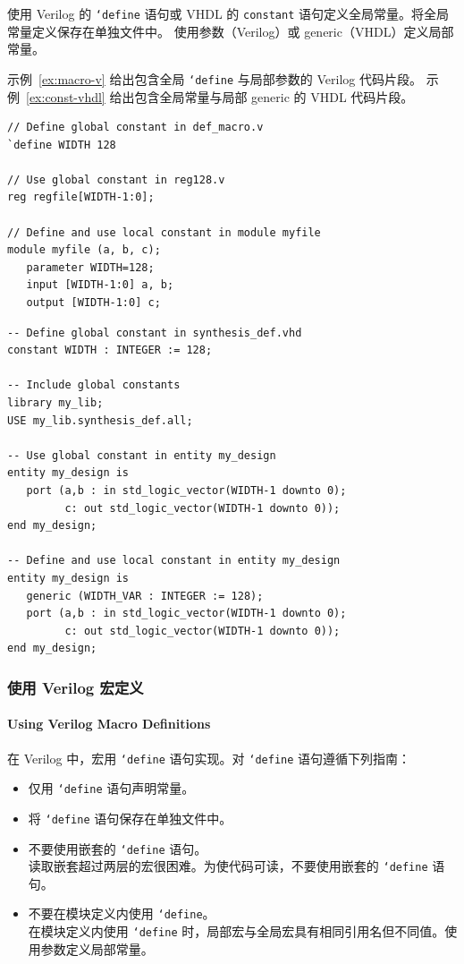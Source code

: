 使用 Verilog 的 \texttt{`define} 语句或 VHDL 的 \texttt{constant} 语句定义全局常量。将全局常量定义保存在单独文件中。
使用参数（Verilog）或 generic（VHDL）定义局部常量。

示例~\ref{ex:macro-v} 给出包含全局 \texttt{`define} 与局部参数的 Verilog 代码片段。
示例~\ref{ex:const-vhdl} 给出包含全局常量与局部 generic 的 VHDL 代码片段。

\begin{lstlisting}[caption={使用宏与参数（Verilog）},label=ex:macro-v]
// Define global constant in def_macro.v
`define WIDTH 128

// Use global constant in reg128.v
reg regfile[WIDTH-1:0];

// Define and use local constant in module myfile
module myfile (a, b, c);
   parameter WIDTH=128;
   input [WIDTH-1:0] a, b;
   output [WIDTH-1:0] c;
\end{lstlisting}

\begin{lstlisting}[caption={使用全局常量与 Generics（VHDL）},label=ex:const-vhdl]
-- Define global constant in synthesis_def.vhd
constant WIDTH : INTEGER := 128;

-- Include global constants
library my_lib;
USE my_lib.synthesis_def.all;

-- Use global constant in entity my_design
entity my_design is
   port (a,b : in std_logic_vector(WIDTH-1 downto 0);
         c: out std_logic_vector(WIDTH-1 downto 0));
end my_design;

-- Define and use local constant in entity my_design
entity my_design is
   generic (WIDTH_VAR : INTEGER := 128);
   port (a,b : in std_logic_vector(WIDTH-1 downto 0);
         c: out std_logic_vector(WIDTH-1 downto 0));
end my_design;
\end{lstlisting}

\subsubsection{使用 Verilog 宏定义}
\paragraph*{Using Verilog Macro Definitions}

在 Verilog 中，宏用 \texttt{`define} 语句实现。对 \texttt{`define} 语句遵循下列指南：
\begin{itemize}
  \item 仅用 \texttt{`define} 语句声明常量。
  \item 将 \texttt{`define} 语句保存在单独文件中。
  \item 不要使用嵌套的 \texttt{`define} 语句。\\
        读取嵌套超过两层的宏很困难。为使代码可读，不要使用嵌套的 \texttt{`define} 语句。
  \item 不要在模块定义内使用 \texttt{`define}。\\
        在模块定义内使用 \texttt{`define} 时，局部宏与全局宏具有相同引用名但不同值。使用参数定义局部常量。
\end{itemize}

